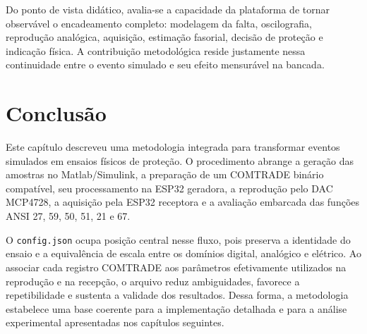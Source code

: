 Do ponto de vista didático, avalia-se a capacidade da plataforma de tornar observável o encadeamento completo: modelagem da falta, oscilografia, reprodução analógica, aquisição, estimação fasorial, decisão de proteção e indicação física. A contribuição metodológica reside justamente nessa continuidade entre o evento simulado e seu efeito mensurável na bancada.

\section{Conclusão}

Este capítulo descreveu uma metodologia integrada para transformar eventos simulados em ensaios físicos de proteção. O procedimento abrange a geração das amostras no Matlab/Simulink, a preparação de um COMTRADE binário compatível, seu processamento na ESP32 geradora, a reprodução pelo DAC MCP4728, a aquisição pela ESP32 receptora e a avaliação embarcada das funções ANSI 27, 59, 50, 51, 21 e 67.

O \texttt{config.json} ocupa posição central nesse fluxo, pois preserva a identidade do ensaio e a equivalência de escala entre os domínios digital, analógico e elétrico. Ao associar cada registro COMTRADE aos parâmetros efetivamente utilizados na reprodução e na recepção, o arquivo reduz ambiguidades, favorece a repetibilidade e sustenta a validade dos resultados. Dessa forma, a metodologia estabelece uma base coerente para a implementação detalhada e para a análise experimental apresentadas nos capítulos seguintes.

